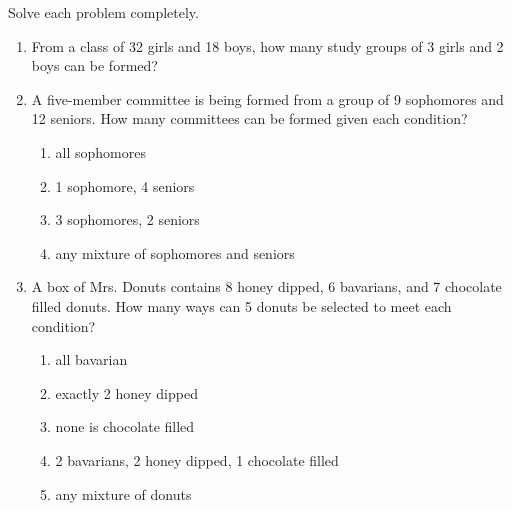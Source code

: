 Solve each problem completely. 
\begin{enumerate}[label = \arabic*. ]
\item From  a class of 32 girls and 18 boys, how many study groups of 3 girls and 2 boys can
be formed?

\item A five-member committee is being formed from a group of 9 sophomores and 12 seniors. How many committees can be formed given each condition?
\begin{enumerate}[label = \alph*. ]

\item all sophomores
\item 1 sophomore, 4 seniors
\item 3 sophomores, 2 seniors
\item any mixture of sophomores and seniors

\end{enumerate}  
\item A box of Mrs. Donuts contains 8 honey dipped, 6 bavarians, and 7 chocolate filled donuts. How many ways can 5 donuts be selected to meet each condition? 
\begin{enumerate}[label = \alph*. ]
\item all bavarian
\item exactly 2 honey dipped 
\item none is chocolate filled
\item 2 bavarians, 2 honey dipped, 1 chocolate filled
\item any mixture of donuts 
\end{enumerate}  

\end{enumerate}   